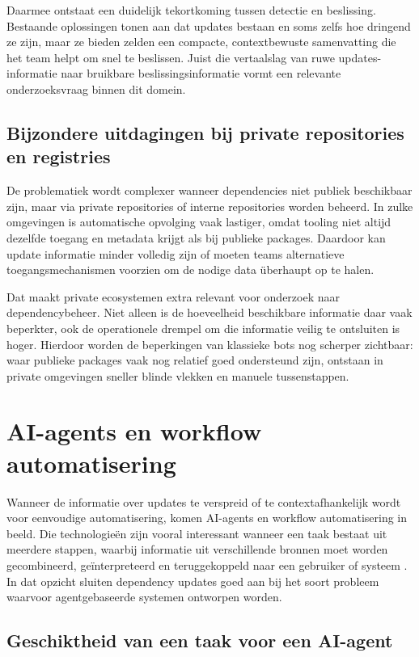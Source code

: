 Daarmee ontstaat een duidelijk tekortkoming tussen detectie en beslissing. Bestaande oplossingen tonen aan dat updates bestaan en soms zelfs hoe dringend ze zijn, maar ze bieden zelden een compacte, contextbewuste samenvatting die het team helpt om snel te beslissen. Juist die vertaalslag van ruwe updates-informatie naar bruikbare beslissingsinformatie vormt een relevante onderzoeksvraag binnen dit domein.

\subsection{Bijzondere uitdagingen bij private repositories en registries}

De problematiek wordt complexer wanneer dependencies niet publiek beschikbaar zijn, maar via private repositories of interne repositories worden beheerd. In zulke omgevingen is automatische opvolging vaak lastiger, omdat tooling niet altijd dezelfde toegang en metadata krijgt als bij publieke packages. Daardoor kan update informatie minder volledig zijn of moeten teams alternatieve toegangsmechanismen voorzien om de nodige data überhaupt op te halen.

Dat maakt private ecosystemen extra relevant voor onderzoek naar dependencybeheer. Niet alleen is de hoeveelheid beschikbare informatie daar vaak beperkter, ook de operationele drempel om die informatie veilig te ontsluiten is hoger. Hierdoor worden de beperkingen van klassieke bots nog scherper zichtbaar: waar publieke packages vaak nog relatief goed ondersteund zijn, ontstaan in private omgevingen sneller blinde vlekken en manuele tussenstappen.

\section{AI-agents en workflow automatisering}
\label{sec:ai-agents-workflows}

Wanneer de informatie over updates te verspreid of te contextafhankelijk wordt voor eenvoudige automatisering, komen AI-agents en workflow automatisering in beeld. Die technologieën zijn vooral interessant wanneer een taak bestaat uit meerdere stappen, waarbij informatie uit verschillende bronnen moet worden gecombineerd, geïnterpreteerd en teruggekoppeld naar een gebruiker of systeem \textcite{Joshi2025,Kim2024,Zhu2025}. In dat opzicht sluiten dependency updates goed aan bij het soort probleem waarvoor agentgebaseerde systemen ontworpen worden.

\subsection{Geschiktheid van een taak voor een AI-agent}


